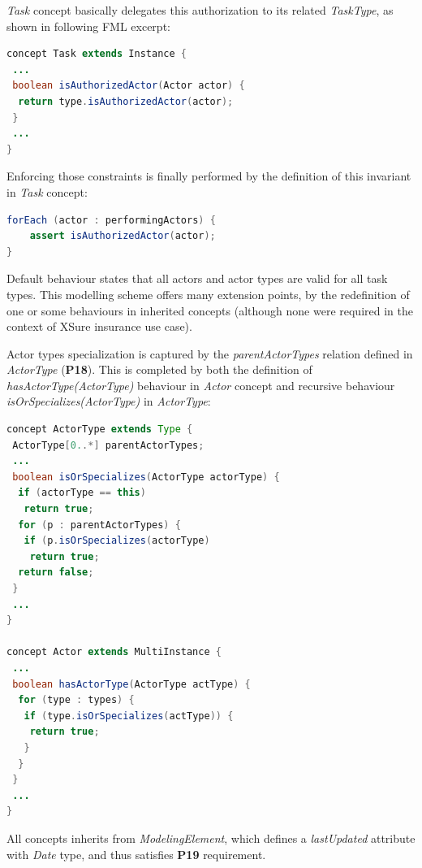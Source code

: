 \textit{Task} concept basically delegates this authorization to its related \textit{TaskType}, as shown in following FML excerpt:

\begin{lstlisting}[breaklines=true, language=java, basicstyle=\ttfamily\scriptsize, mathescape=true]
concept Task extends Instance {
 ...
 boolean isAuthorizedActor(Actor actor) {      
  return type.isAuthorizedActor(actor);      
 }  
 ...
}
\end{lstlisting}

Enforcing those constraints is finally performed by the definition of this invariant in \textit{Task} concept:

\begin{lstlisting}[breaklines=true, language=java, basicstyle=\ttfamily\scriptsize, mathescape=true]
forEach (actor : performingActors) {
    assert isAuthorizedActor(actor);
}
\end{lstlisting}

Default behaviour states that all actors and actor types are valid for all task types. This modelling scheme offers many extension points, by the redefinition of one or some behaviours in inherited concepts (although none were required in the context of XSure insurance use case).

Actor types specialization is captured by the \textit{parentActorTypes} relation defined in \textit{ActorType} (\textbf{P18}). This is completed by both the definition of \textit{hasActorType(ActorType)} behaviour in \textit{Actor} concept and recursive behaviour \textit{isOrSpecializes(ActorType)} in \textit{ActorType}:

\begin{lstlisting}[breaklines=true, language=java, basicstyle=\ttfamily\scriptsize, mathescape=true]
concept ActorType extends Type {
 ActorType[0..*] parentActorTypes;
 ...
 boolean isOrSpecializes(ActorType actorType) {    
  if (actorType == this)   
   return true;      
  for (p : parentActorTypes) {      
   if (p.isOrSpecializes(actorType)
    return true;        
  return false;    
 }
 ...
}

concept Actor extends MultiInstance {
 ...
 boolean hasActorType(ActorType actType) {      
  for (type : types) {
   if (type.isOrSpecializes(actType)) {
    return true;
   }
  }     
 }  
 ...
}
\end{lstlisting}

All concepts inherits from \textit{ModelingElement}, which defines a \textit{lastUpdated} attribute with \textit{Date} type, and thus satisfies \textbf{P19} requirement. 

